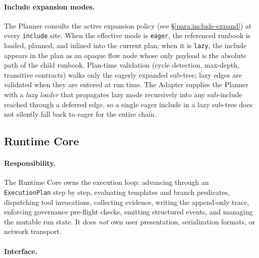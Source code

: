 \paragraph{Include expansion modes.}
\label{para:planner-expand}
The Planner consults the active expansion policy (see
\S\ref{para:include-expand}) at every \texttt{include} site. When the
effective mode is \texttt{eager}, the referenced runbook is loaded, planned,
and inlined into the current plan; when it is \texttt{lazy}, the include
appears in the plan as an opaque flow node whose only payload is the absolute
path of the child runbook. Plan-time validation (cycle detection, max-depth,
transitive contracts) walks only the eagerly expanded sub-tree; lazy edges
are validated when they are entered at run time. The Adapter supplies the
Planner with a \emph{lazy loader} that propagates lazy mode recursively into
any sub-include reached through a deferred edge, so a single eager include in
a lazy sub-tree does not silently fall back to eager for the entire chain.

\subsection{Runtime Core}

\paragraph{Responsibility.}
The Runtime Core owns the execution loop: advancing through an \texttt{ExecutionPlan} step by step,
evaluating templates and branch predicates, dispatching tool invocations, collecting evidence, writing
the append-only trace, enforcing governance pre-flight checks, emitting structured events, and
managing the mutable run state. It does \emph{not} own user presentation, serialization formats, or
network transport.

\paragraph{Interface.}

